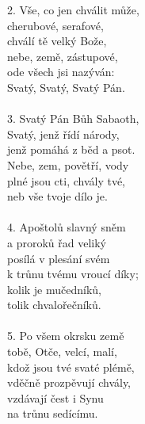 \begin{translatioMulticol}{3}
{\color{red}2. }Vše, co jen chválit může,\\
cherubové, serafové,\\
chválí tě velký Bože,\\
nebe, země, zástupové,\\
ode všech jsi nazýván:\\
Svatý, Svatý, Svatý Pán.\\
\\
{\color{red}3. }Svatý Pán Bůh Sabaoth,\\
Svatý, jenž řídí národy,\\
jenž pomáhá z běd a psot.\\
Nebe, zem, povětří, vody\\
plné jsou cti, chvály tvé,\\
neb vše tvoje dílo je.\\
\\
{\color{red}4. }Apoštolů slavný sněm\\
a proroků řad veliký\\
posílá v plesání svém\\
k trůnu tvému vroucí díky;\\
kolik je mučedníků,\\
tolik chvalořečníků.\\
\\
{\color{red}5. }Po všem okrsku země\\
tobě, Otče, velcí, malí,\\
kdož jsou tvé svaté plémě,\\
vděčně prozpěvují chvály,\\
vzdávají čest i Synu\\
na trůnu sedícímu.\columnbreak


\end{translatioMulticol}
